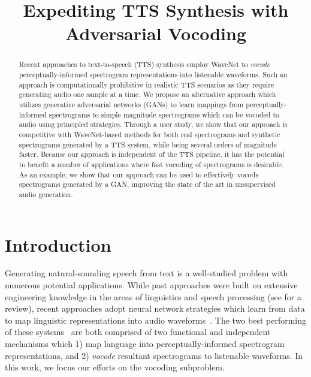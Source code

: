 \documentclass[a4paper]{article}
\title{Expediting TTS Synthesis with Adversarial Vocoding}
\begin{document}
\maketitle
% 
\begin{abstract}
Recent approaches to text-to-speech (TTS) synthesis employ WaveNet to \emph{vocode} perceptually-informed spectrogram representations into listenable waveforms. 
Such an approach is computationally prohibitive in realistic TTS scenarios as they require generating audio one sample at a time. 
We propose an alternative approach which utilizes generative adversarial networks (GANs) to learn mappings from perceptually-informed spectrograms to simple magnitude spectrograms which can be vocoded to audio using principled strategies. 
Through a user study, we show that our approach is competitive with WaveNet-based methods for both real spectrograms and synthetic spectrograms generated by a TTS system, while being several orders of magnitude faster. 
Because our approach is independent of the TTS pipeline, it has the potential to benefit a number of applications where fast vocoding of spectrograms is desirable. 
As an example, we show that our approach can be used to effectively vocode spectrograms generated by a GAN, improving the state of the art in unsupervised audio generation.
\end{abstract}


\section{Introduction}

Generating natural-sounding speech from text is a well-studied problem with numerous potential applications. 
While past approaches were built on extensive engineering knowledge in the areas of linguistics and speech processing  (see \cite{} for a review), 
recent approaches adopt neural network strategies which learn from data to map linguistic representations into audio waveforms~\cite{arik2017deep,gibiansky2017deep,ping2017deep,wang2017tacotron,shen2018natural}. 
The two best performing of these systems~\cite{ping2017deep,shen2018natural}
are both comprised of two functional and independent mechanisms which 
1) map language into perceptually-informed spectrogram representations, and 
2) \emph{vocode} resultant spectrograms to listenable waveforms. 
In this work, we focus our efforts on the vocoding subproblem.
\end{document}
